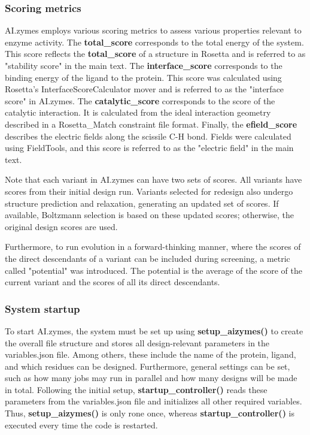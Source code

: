 \documentclass[10pt]{extarticle}
\begin{document}
\subsubsection{Scoring metrics}

AI.zymes employs various scoring metrics to assess various properties relevant to enzyme activity. The \textbf{total\_score} corresponds to the total energy of the system. This score reflects the \textbf{total\_score} of a structure in Rosetta and is referred to as "stability score" in the main text. The \textbf{interface\_score} corresponds to the binding energy of the ligand to the protein. This score was calculated using Rosetta's InterfaceScoreCalculator mover and is referred to as the "interface score" in AI.zymes. The \textbf{catalytic\_score} corresponds to the score of the catalytic interaction. It is calculated from the ideal interaction geometry described in a Rosetta\_Match constraint file format. Finally, the \textbf{efield\_score} describes the electric fields along the scissile C-H bond. Fields were calculated using FieldTools, and this score is referred to as the "electric field" in the main text.

Note that each variant in AI.zymes can have two sets of scores. All variants have scores from their initial design run. Variants selected for redesign also undergo structure prediction and relaxation, generating an updated set of scores. If available, Boltzmann selection is based on these updated scores; otherwise, the original design scores are used.

Furthermore, to run evolution in a forward-thinking manner, where the scores of the direct descendants of a variant can be included during screening, a metric called "potential" was introduced. The potential is the average of the score of the current variant and the scores of all its direct descendants.

\subsubsection{System startup}

To start AI.zymes, the system must be set up using \textbf{setup\_aizymes()} to create the overall file structure and stores all design-relevant parameters in the variables.json file. Among others, these include the name of the protein, ligand, and which residues can be designed. Furthermore, general settings can be set, such as how many jobs may run in parallel and how many designs will be made in total. Following the initial setup, \textbf{startup\_controller()} reads these parameters from the variables.json file and initializes all other required variables. Thus, \textbf{setup\_aizymes()} is only rone once, whereas \textbf{startup\_controller()} is executed every time the code is restarted. 
\end{document}

